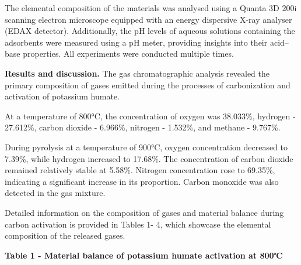 The elemental composition of the materials was analysed using a Quanta
3D 200i scanning electron microscope equipped with an energy dispersive
X-ray analyser (EDAX detector). Additionally, the pH levels of aqueous
solutions containing the adsorbents were measured using a pH meter,
providing insights into their acid--base properties. All experiments
were conducted multiple times.

{\bfseries Results and discussion.} The gas chromatographic analysis
revealed the primary composition of gases emitted during the processes
of carbonization and activation of potassium humate.

At a temperature of 800°C, the concentration of oxygen was 38.033\%,
hydrogen - 27.612\%, carbon dioxide - 6.966\%, nitrogen - 1.532\%, and
methane - 9.767\%.

During pyrolysis at a temperature of 900°C, oxygen concentration
decreased to 7.39\%, while hydrogen increased to 17.68\%. The
concentration of carbon dioxide remained relatively stable at 5.58\%.
Nitrogen concentration rose to 69.35\%, indicating a significant
increase in its proportion. Carbon monoxide was also detected in the gas
mixture.

Detailed information on the composition of gases and material balance
during carbon activation is provided in Tables 1- 4, which showcase the
elemental composition of the released gases.

{\bfseries Table 1 - Material balance of potassium humate activation at
800℃}

